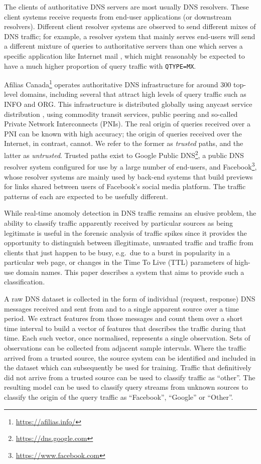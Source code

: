 \documentclass[conference]{IEEEtran}
\let\citep\cite
\begin{document}
The clients of authoritative DNS servers are most usually DNS resolvers.
These client systems receive requests from end-user applications (or
downstream resolvers). Different client resolver systems are observed to
send different mixes of DNS traffic; for example, a resolver system that
mainly serves end-users will send a different mixture of queries to
authoritative servers than one which serves a specific application like
Internet mail \citep{rfc5321}, which might reasonably be expected to
have a much higher proportion of query traffic with \texttt{QTYPE=MX}.

Afilias Canada\footnote{\url{https://afilias.info/}} operates
authoritative DNS infrastructure for around 300 top-level domains,
including several that attract high levels of query traffic such as INFO
and ORG. This infrastructure is distributed globally using anycast
service distribution \citep{rfc4786}, using commodity transit services,
public peering and so-called Private Network Interconnects (PNIs). The
real origin of queries received over a PNI can be known with high
accuracy; the origin of queries received over the Internet, in contrast,
cannot. We refer to the former as \emph{trusted} paths, and the latter
as \emph{untrusted}. Trusted paths exist to Google Public
DNS\footnote{\url{https://dns.google.com}}, a public DNS resolver system
configured for use by a large number of end-users, and
Facebook\footnote{\url{https://www.facebook.com}}, whose resolver
systems are mainly used by back-end systems that build previews for
links shared between users of Facebook's social media platform. The
traffic patterns of each are expected to be usefully different.

While real-time anomoly detection in DNS traffic remains an elusive
problem, the ability to classify traffic apparently received by
particular sources as being legitimate is useful in the forensic
analysis of traffic spikes since it provides the opportunity to
distinguish between illegitimate, unwanted traffic and traffic from
clients that just happen to be busy, e.g.~due to a burst in popularity
in a particular web page, or changes in the Time To Live (TTL)
parameters of high-use domain names. This paper describes a system that
aims to provide such a classification.

A raw DNS dataset is collected in the form of individual (request,
response) DNS messages received and sent from and to a single apparent
source over a time period. We extract features from those messages and
count them over a short time interval to build a vector of features that
describes the traffic during that time. Each such vector, once
normalised, represents a single observation. Sets of observations can be
collected from adjacent sample intervals. Where the traffic arrived from
a trusted source, the source system can be identified and included in
the dataset which can subsequently be used for training. Traffic that
definitively did not arrive from a trusted source can be used to
classify traffic as ``other''. The resulting model can be used to
classify query streams from unknown sources to classify the origin of
the query traffic as ``Facebook'', ``Google'' or ``Other''.
\end{document}
